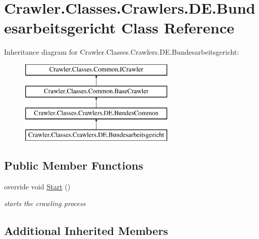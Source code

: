 \hypertarget{class_crawler_1_1_classes_1_1_crawlers_1_1_d_e_1_1_bundesarbeitsgericht}{\section{Crawler.\-Classes.\-Crawlers.\-D\-E.\-Bundesarbeitsgericht Class Reference}
\label{class_crawler_1_1_classes_1_1_crawlers_1_1_d_e_1_1_bundesarbeitsgericht}
}
Inheritance diagram for Crawler.\-Classes.\-Crawlers.\-D\-E.\-Bundesarbeitsgericht\-:\begin{figure}[H]
\begin{center}
\leavevmode
\includegraphics[height=4.000000cm]{class_crawler_1_1_classes_1_1_crawlers_1_1_d_e_1_1_bundesarbeitsgericht}
\end{center}
\end{figure}
\subsection*{Public Member Functions}
\begin{DoxyCompactItemize}
\item 
override void \hyperlink{class_crawler_1_1_classes_1_1_crawlers_1_1_d_e_1_1_bundesarbeitsgericht_a3f0b91fd367fac005e6f3f11148e2e41}{Start} ()
\begin{DoxyCompactList}\small\item\em starts the crawling process \end{DoxyCompactList}\end{DoxyCompactItemize}
\subsection*{Additional Inherited Members}


